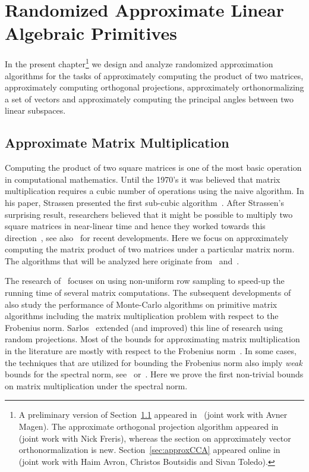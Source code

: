 \chapter{Randomized Approximate Linear Algebraic Primitives}\label{chap:rnla}
%
%
In the present chapter\footnote{A preliminary version of Section~\ref{sec:apps:matrix_mult} appeared in~\cite{chernoff:matrix_valued:MZ11} (joint work with Avner Magen). The approximate orthogonal projection algorithm appeared in~\cite{REK} (joint work with Nick Freris), whereas the section on approximately vector orthonormalization is new. Section~\ref{sec:approxCCA} appeared online in~\cite{approxCCA} (joint work with Haim Avron, Christos Boutsidis and Sivan Toledo).} we design and analyze randomized approximation algorithms for the tasks of approximately computing the product of two matrices, approximately computing orthogonal projections, approximately orthonormalizing a set of vectors and approximately computing the principal angles between two linear subspaces.
%
%
\section{Approximate Matrix Multiplication}\label{sec:apps:matrix_mult}
%
Computing the product of two square matrices is one of the most basic operation in computational mathematics. Until the 1970's it was believed that matrix multiplication requires a cubic number of operations using the naive algorithm. In his paper, Strassen presented the first sub-cubic algorithm~\cite{matrixmult:strassen}. After Strassen's surprising result, researchers believed that it might be possible to multiply two square matrices in near-linear time and hence they worked towards this direction~\cite{matrixmult:CW,matrixmult:group}, see also~\cite{matrixmult:virginia} for recent developments. Here we focus on approximately computing the matrix product of two matrices under a particular matrix norm. The algorithms that will be analyzed here originate from~\cite{mm:Cohen,MM:focs} and~\cite{sarlos}.
%

%
The research of~\cite{lowrank:FKV} focuses on using non-uniform row sampling to speed-up the running time of several matrix computations. The subsequent developments of~\cite{matrixmult:drineas,lowrank:drineas, matrixdecomp:drineas} also study the performance of Monte-Carlo algorithms on primitive matrix algorithms including the matrix multiplication problem with respect to the Frobenius norm. Sarlos~\cite{sarlos} extended (and improved) this line of research using random projections. Most of the bounds for approximating matrix multiplication in the literature are mostly with respect to the Frobenius norm~\cite{matrixmult:drineas, sarlos, CW_stoc09}. In some cases, the techniques that are utilized for bounding the Frobenius norm also imply \emph{weak} bounds for the spectral norm, see~\cite[Theorem~4]{matrixmult:drineas} or~\cite[Corollary~11]{sarlos}. Here we prove the first non-trivial bounds on matrix multiplication under the spectral norm.
%

